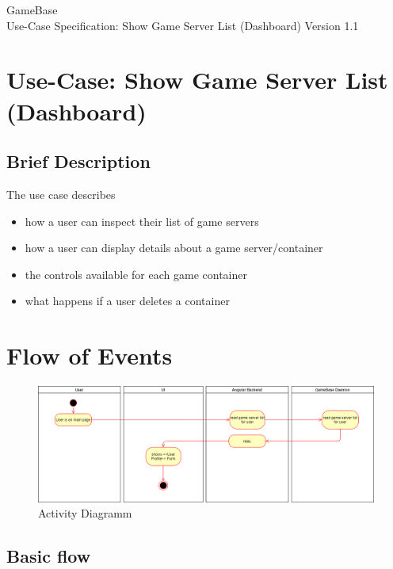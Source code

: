 \documentclass[a4paper,12pt,chapterprefix=false,bibliography=totoc,listof=totoc,book]{scrreprt}
\begin{document}
    \begin{flushright}
        GameBase
        \\
        Use-Case Specification: Show Game Server List (Dashboard)
        \bigbreak
        Version 1.1
    \end{flushright}

    \tableofcontents

    \chapter{Use-Case: Show Game Server List (Dashboard)}

    \section{Brief Description}
    The use case describes
    \begin{itemize}
        \item how a user can inspect their list of game servers
        \item how a user can display details about a game server/container
        \item the controls available for each game container
        \item what happens if a user deletes a container
    \end{itemize}

    \chapter{Flow of Events}
    \begin{figure}[H]
        \includegraphics[width=\textwidth]{diagramms/UCShowGameServerListDiagramm.png}
        \caption{Activity Diagramm}
        \label{fig:ucd}
    \end{figure}
    \section{Basic flow}
\end{document}
